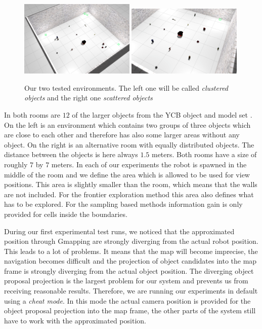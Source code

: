 \documentclass[a4paper,11pt,english]{article}
\begin{document}
\begin{figure}[h!]
	\begin{center}
		\includegraphics[width=0.49\textwidth]{src/clustered.png}
		\includegraphics[width=0.49\textwidth]{src/scattered.png}
		\caption{Our two tested environments. The left one will be called \textit{clustered objects} and the right one \textit{scattered objects}}
		\label{fig:rooms}
	\end{center}
\end{figure}

In both rooms are $12$ of the larger objects from the YCB object and model set \cite{calli2015benchmarking}.
On the left is an environment which contains two groups of three objects which are close to each other and therefore has also some larger areas without any object.
On the right is an alternative room with equally distributed objects. The distance between the objects is here always $1.5$ meters. Both rooms have a size of roughly $7$ by $7$ meters.
In each of our experiments the robot is spawned in the middle of the room and we define the area which is allowed to be used for view positions. This area is slightly smaller than the room, which means that the walls are not included.
For the frontier exploration method this area also defines what has to be explored.
For the sampling based methods information gain is only provided for cells inside the boundaries.

During our first experimental test runs, we noticed that the approximated position through Gmapping are strongly diverging from the actual robot position.
This leads to a lot of problems. It means that the map will become imprecise, the navigation becomes difficult and the projection of object candidates into the map frame is strongly diverging from the actual object position.
The diverging object proposal projection is the largest problem for our system and prevents us from receiving reasonable results. Therefore, we are running our experiments in default using a \textit{cheat mode}.
In this mode the actual camera position is provided for the object proposal projection into the map frame, the other parts of the system still have to work with the approximated position.
\end{document}
